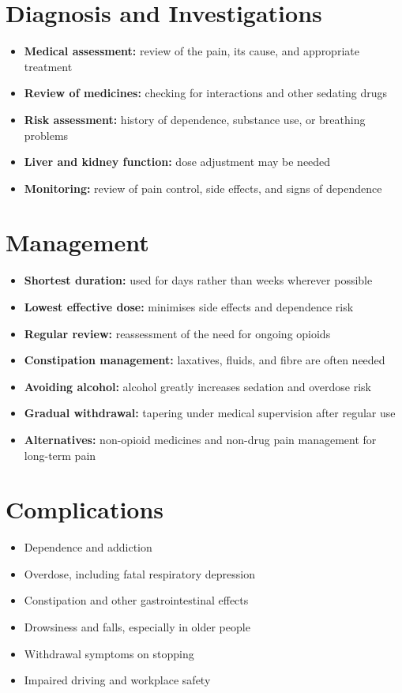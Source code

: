 \section*{Diagnosis and Investigations}
\begin{itemize}
    \item \textbf{Medical assessment:} review of the pain, its cause, and appropriate treatment
    \item \textbf{Review of medicines:} checking for interactions and other sedating drugs
    \item \textbf{Risk assessment:} history of dependence, substance use, or breathing problems
    \item \textbf{Liver and kidney function:} dose adjustment may be needed
    \item \textbf{Monitoring:} review of pain control, side effects, and signs of dependence
\end{itemize}

\section*{Management}
\begin{itemize}
    \item \textbf{Shortest duration:} used for days rather than weeks wherever possible
    \item \textbf{Lowest effective dose:} minimises side effects and dependence risk
    \item \textbf{Regular review:} reassessment of the need for ongoing opioids
    \item \textbf{Constipation management:} laxatives, fluids, and fibre are often needed
    \item \textbf{Avoiding alcohol:} alcohol greatly increases sedation and overdose risk
    \item \textbf{Gradual withdrawal:} tapering under medical supervision after regular use
    \item \textbf{Alternatives:} non-opioid medicines and non-drug pain management for long-term pain
\end{itemize}

\section*{Complications}
\begin{itemize}
    \item Dependence and addiction
    \item Overdose, including fatal respiratory depression
    \item Constipation and other gastrointestinal effects
    \item Drowsiness and falls, especially in older people
    \item Withdrawal symptoms on stopping
    \item Impaired driving and workplace safety
\end{itemize}

